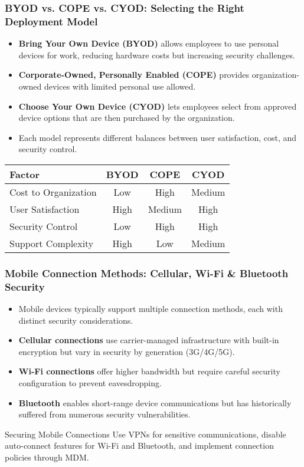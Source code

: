 \documentclass{beamer}
\begin{document}
\begin{frame}
    \frametitle{BYOD vs. COPE vs. CYOD: Selecting the Right Deployment Model}
    
    \begin{itemize}
        \item \textbf{Bring Your Own Device (BYOD)} allows employees to use personal devices for work, reducing hardware costs but increasing security challenges.
        \item \textbf{Corporate-Owned, Personally Enabled (COPE)} provides organization-owned devices with limited personal use allowed.
        \item \textbf{Choose Your Own Device (CYOD)} lets employees select from approved device options that are then purchased by the organization.
        \item Each model represents different balances between user satisfaction, cost, and security control.
    \end{itemize}
    
    \begin{table}
        \begin{tabular}{|l|c|c|c|}
            \hline
            \textbf{Factor} & \textbf{BYOD} & \textbf{COPE} & \textbf{CYOD} \\
            \hline
            Cost to Organization & Low & High & Medium \\
            User Satisfaction & High & Medium & High \\
            Security Control & Low & High & High \\
            Support Complexity & High & Low & Medium \\
            \hline
        \end{tabular}
    \end{table}
\end{frame}

\begin{frame}
    \frametitle{Mobile Connection Methods: Cellular, Wi-Fi \& Bluetooth Security}
    
    \begin{itemize}
        \item Mobile devices typically support multiple connection methods, each with distinct security considerations.
        \item \textbf{Cellular connections} use carrier-managed infrastructure with built-in encryption but vary in security by generation (3G/4G/5G).
        \item \textbf{Wi-Fi connections} offer higher bandwidth but require careful security configuration to prevent eavesdropping.
        \item \textbf{Bluetooth} enables short-range device communications but has historically suffered from numerous security vulnerabilities.
    \end{itemize}
    
    \begin{block}{Securing Mobile Connections}
        Use VPNs for sensitive communications, disable auto-connect features for Wi-Fi and Bluetooth, and implement connection policies through MDM.
    \end{block}
\end{frame}
\end{document}
